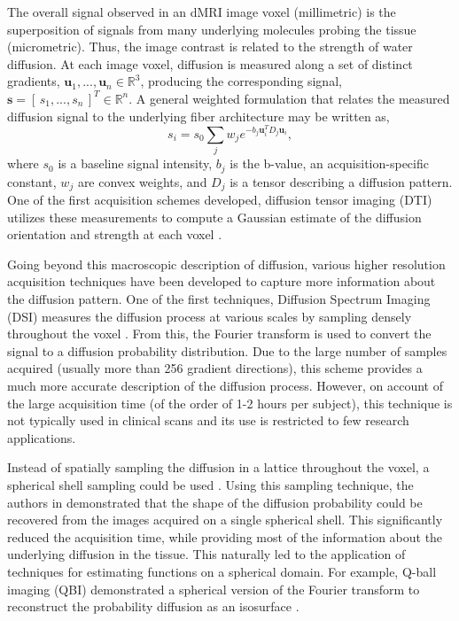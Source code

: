 \documentclass[final,hyperref]{gatech-thesis}
\renewcommand{\v}[1]{\ensuremath{\mathbf #1}\xspace}
\newcommand{\rv}[1]{\ensuremath{[\, #1 \,]}\xspace} %
\newcommand{\R}{\ensuremath{\mathbb R}}
\newcommand{\s}{\v s}
\renewcommand{\u}{\v u}
\begin{document}
The overall signal observed in an dMRI image voxel (millimetric) is the
superposition of signals from many underlying molecules probing the tissue
(micrometric).
%
Thus, the image contrast is related to the strength of water diffusion. At
each image voxel, diffusion is measured along a set of distinct gradients,
$\u_1,...,\u_n\in\R^3$, producing the corresponding signal,
$\s=\rv{s_1,...,s_n}^T\in\R^n$. A general weighted formulation that relates
the measured diffusion signal to the underlying fiber architecture may be
written as,
\begin{equation} \label{eq:general_model}
  s_i = s_0 \sum_j w_j e^{ -b_j \u_i^T D_j \u_i },
\end{equation}
where $s_0$ is a baseline signal intensity, $b_j$ is the b-value, an
acquisition-specific constant, $w_j$ are convex weights, and $D_j$ is a tensor
describing a diffusion pattern.
%
One of the first acquisition schemes developed, diffusion tensor imaging (DTI)
utilizes these measurements to compute a Gaussian estimate of the diffusion
orientation and strength at each voxel \cite{Basser1994jmr,LeBihan2003}.

Going beyond this macroscopic description of diffusion, various higher
resolution acquisition techniques have been developed to capture more
information about the diffusion pattern.  One of the first techniques,
Diffusion Spectrum Imaging (DSI)  measures the
diffusion process at various scales by sampling densely throughout the voxel
\cite{Wedeen2005,Hagmann2005phd}.  From this, the Fourier transform is used to
convert the signal to a diffusion probability distribution.  Due to the large
number of samples acquired (usually more than 256 gradient directions), this
scheme provides a much more accurate description of the diffusion process.
However, on account of the large acquisition time (of the order of 1-2 hours
per subject), this technique is not typically used in clinical scans and its
use is restricted to few research applications.

Instead of spatially sampling the diffusion in a lattice throughout the voxel,
a spherical shell sampling could be used \cite{Tuch2002phd}. Using this
sampling technique, the authors in \cite{Tuch2004} demonstrated that the shape
of the diffusion probability could be recovered from the images acquired on a
single spherical shell.  This significantly reduced the acquisition time,
while providing most of the information about the underlying diffusion in the
tissue.  This naturally led to the application of techniques for estimating
functions on a spherical domain.  For example, Q-ball imaging (QBI)
demonstrated a spherical version of the Fourier transform to reconstruct the
probability diffusion as an isosurface \cite{Tuch2002phd}.
\end{document}
